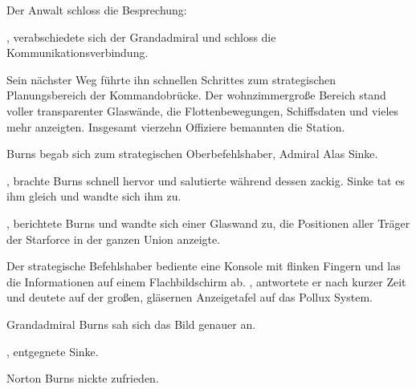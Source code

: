 \par

Der Anwalt schloss die Besprechung: 

\par

, verabschiedete sich der Grandadmiral und schloss die Kommunikationsverbindung.

\par

Sein nächster Weg führte ihn schnellen Schrittes zum strategischen Planungsbereich der Kommandobrücke. Der wohnzimmergroße Bereich stand voller transparenter Glaswände, die Flottenbewegungen, Schiffsdaten und vieles mehr anzeigten. Insgesamt vierzehn Offiziere bemannten die Station.

\par

Burns begab sich zum strategischen Oberbefehlshaber, Admiral Alas Sinke.

\par

, brachte Burns schnell hervor und salutierte während dessen zackig. Sinke tat es ihm gleich und wandte sich ihm zu. 

\par

, berichtete Burns und wandte sich einer Glaswand zu, die Positionen aller Träger der Starforce in der ganzen Union anzeigte. 

\par

Der strategische Befehlshaber bediente eine Konsole mit flinken Fingern und las die Informationen auf einem Flachbildschirm ab. , antwortete er nach kurzer Zeit und deutete auf der großen, gläsernen Anzeigetafel auf das Pollux System. 

\par

Grandadmiral Burns sah sich das Bild genauer an. 

\par

, entgegnete Sinke. 

\par

Norton Burns nickte zufrieden. 